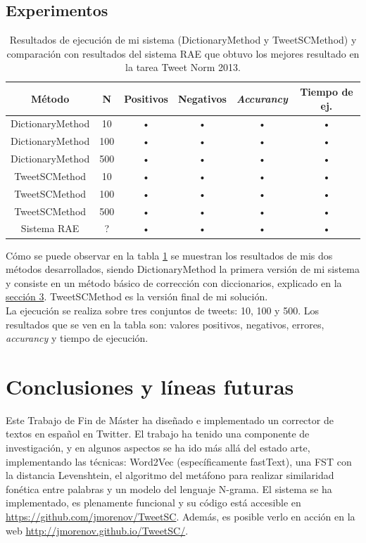 \documentclass[spanish,12pt, a4paper,twoside]{paper}
\let\oldsection\section
\def\section{\cleardoublepage\oldsection}
\begin{document}
\subsection{Experimentos}\label{sec:experimentos}
\begin{table}[htb]
\centering
\caption{Resultados de ejecución de mi sistema (DictionaryMethod y TweetSCMethod) y comparación con resultados del sistema RAE \cite{porta:2013} que obtuvo los mejores resultado en la tarea Tweet Norm 2013\cite{alegria:2013}.}
\label{table:results}
\begin{tabular}{|c|c|c|c|c|c|}
\hline 
\textbf{Método} & \textbf{N} & \textbf{Positivos} & \textbf{Negativos} & \textbf{\textit{Accurancy}} & \textbf{Tiempo de ej.} \\ 
\hline 
DictionaryMethod & 10 & • & • & • & • \\ 
\hline 
DictionaryMethod & 100 & • & • & • & • \\ 
\hline 
DictionaryMethod & 500 & • & • & • & • \\ 
\hline 
TweetSCMethod & 10 & • & • & • & • \\ 
\hline 
TweetSCMethod & 100 & • & • & • & • \\ 
\hline 
TweetSCMethod & 500 & • & • & • & • \\ 
\hline 
Sistema RAE & ? & • & • & • & • \\ 
\hline 
\end{tabular}
\end{table}

Cómo se puede observar en la tabla \ref{table:results} se muestran los resultados de mis dos métodos desarrollados, siendo DictionaryMethod la primera versión de mi sistema y consiste en un método básico de corrección con diccionarios, explicado en la \hyperref[sec:solucionpropuesta]{sección 3}. TweetSCMethod es la versión final de mi solución.\\

La ejecución se realiza sobre tres conjuntos de tweets: 10, 100 y 500. Los resultados que se ven en la tabla son: valores positivos, negativos, errores, \textit{accurancy} y tiempo de ejecución.

\section{Conclusiones y líneas futuras}\label{sec:conclusiones}
Este Trabajo de Fin de Máster ha diseñado e implementado un corrector de textos en español en Twitter. El trabajo ha tenido una componente de investigación, y en algunos aspectos se ha ido más allá del estado arte, implementando las técnicas: Word2Vec (específicamente fastText), una FST con la distancia Levenshtein, el algoritmo del metáfono para realizar similaridad fonética entre palabras y un modelo del lenguaje N-grama. El sistema se ha implementado, es plenamente funcional y su código está accesible en \url{https://github.com/jmorenov/TweetSC}. Además, es posible verlo en acción en la web \url{http://jmorenov.github.io/TweetSC/}.\\
\end{document}
